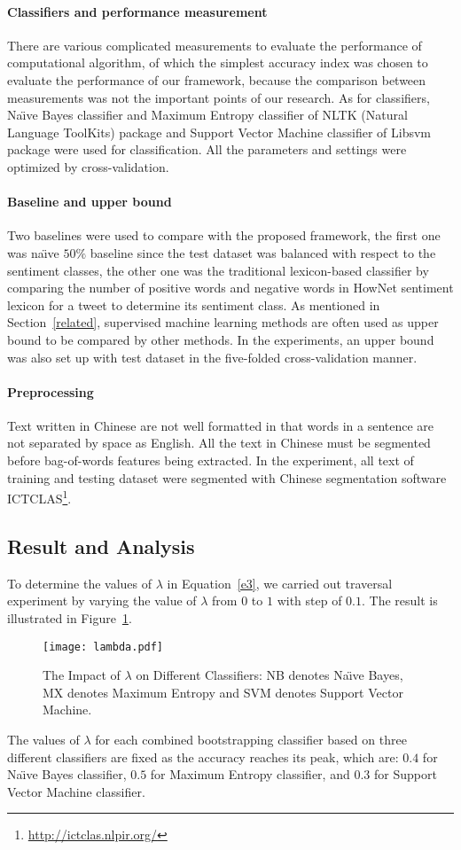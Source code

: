 \begin{definition}[假设]
\paragraph{Classifiers and performance measurement}
There are various complicated measurements to evaluate the performance of computational algorithm, of which the simplest accuracy index was chosen to evaluate the performance of our framework, because the comparison between measurements was not the important points of our research. 
As for classifiers, Na\"\i ve Bayes classifier and Maximum Entropy classifier of NLTK (Natural Language ToolKits) \cite{xsongx:b27} package and Support Vector Machine classifier of Libsvm \cite{xsongx:b28} package were used for classification. 
All the parameters and settings were optimized by cross-validation.
\paragraph{Baseline and upper bound}
Two baselines were used to compare with the proposed framework, the first one was na\"\i ve $ 50\% $ baseline since the test dataset was balanced with respect to the sentiment classes, the other one was the traditional lexicon-based classifier by comparing the number of positive words and negative words in HowNet sentiment lexicon for a tweet to determine its sentiment class.
As mentioned in Section~\ref{related}, supervised machine learning methods are often used as upper bound to be compared by other methods. 
In the experiments, an upper bound was also set up with test dataset in the five-folded cross-validation manner.
\paragraph{Preprocessing}
Text written in Chinese are not well formatted in that words in a sentence are not separated by space as English. 
All the text in Chinese must be segmented before bag-of-words features being extracted. 
In the experiment, all text of training and testing dataset were segmented with Chinese segmentation software ICTCLAS\footnote{\url{http://ictclas.nlpir.org/}}.

\subsection{Result and Analysis}
\label{result}
To determine the values of $ \lambda $ in Equation~\ref{e3}, we carried out traversal experiment by varying the value of $ \lambda $ from $ 0 $ to $ 1 $ with step of $ 0.1 $. The result is illustrated in Figure~\ref{fig2}.
\begin{figure}[!t]
\centering
\texttt{[image: lambda.pdf]}
\caption{The Impact of $ \lambda $ on Different Classifiers: NB denotes Na\"\i ve Bayes, MX denotes Maximum Entropy and SVM denotes Support Vector Machine.}
\label{fig2}
\end{figure}
The values of $ \lambda $ for each combined bootstrapping classifier based on three different classifiers are fixed as the accuracy reaches its peak, which are: $ 0.4 $ for Na\"\i ve Bayes classifier, $ 0.5 $ for Maximum Entropy classifier, and $ 0.3 $ for Support Vector Machine classifier.


\end{definition}
